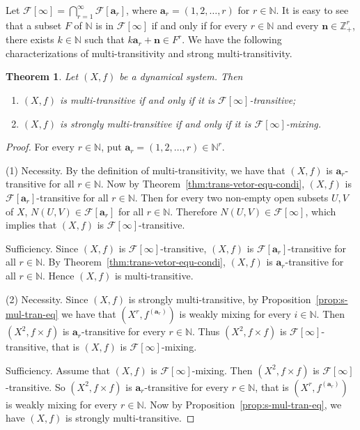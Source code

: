 \documentclass[12pt,a4paper]{amsart}
\newtheorem{thm}{Theorem}[section]
\theoremstyle{definition}
\numberwithin{equation}{section}
\begin{document}
Let $\mathcal{F}[\infty]=\bigcap\limits_{r=1}^\infty \mathcal{F}[\mathbf{a}_r]$,
where $\mathbf{a}_r=(1,2,\dotsc,r)$  for $r\in\mathbb{N}$.
It is easy to see that a subset $F$ of $\mathbb{N}$ is in $\mathcal{F}[\infty]$ if and only if
for every $r\in\mathbb{N}$ and every $\mathbf{n}\in \mathbb{Z}_+^r$, there exists $k\in\mathbb{N}$
such that $k\mathbf{a}_r+\mathbf{n}\in F^r$.
We have the following characterizations of multi-transitivity and strong  multi-transitivity.

\begin{thm}\label{thm:multi-trans-equ-condi-infty}
Let $(X,f)$ be a dynamical system. Then
\begin{enumerate}
  \item $(X,f)$ is multi-transitive if and only if it is $\mathcal{F}[\infty]$-transitive;
  \item $(X,f)$ is strongly multi-transitive if and only if it is $\mathcal{F}[\infty]$-mixing.
\end{enumerate}
\end{thm}

\begin{proof}
For every $r\in\mathbb{N}$, put $\mathbf{a}_r=(1,2,\dotsc,r)\in \mathbb{N}^r$.

(1) Necessity. By the definition of multi-transitivity,
we have that $(X,f)$ is $\mathbf{a}_r$-transitive for all $r\in\mathbb{N}$.
Now by Theorem~\ref{thm:trans-vetor-equ-condi},
$(X,f)$ is $\mathcal{F}[\mathbf{a}_r]$-transitive for all $r\in\mathbb{N}$.
Then for every two non-empty open subsets $U,V$ of $X$,
$N(U,V)\in \mathcal{F}[\mathbf{a}_r]$ for all $r\in\mathbb{N}$.
Therefore $N(U,V)\in \mathcal{F}[\infty]$,
which implies that $(X,f)$ is $\mathcal{F}[\infty]$-transitive.

Sufficiency. Since $(X,f)$ is $\mathcal{F}[\infty]$-transitive,
$(X,f)$ is $\mathcal{F}[\mathbf{a}_r]$-transitive for all $r\in\mathbb{N}$.
By Theorem~\ref{thm:trans-vetor-equ-condi},
$(X,f)$ is $\mathbf{a}_r$-transitive for all $r\in\mathbb{N}$.
Hence $(X,f)$ is multi-transitive.

(2) Necessity. Since $(X,f)$ is strongly multi-transitive,
by Proposition~\ref{prop:s-mul-tran-eq} we have that $(X^r,f^{(\mathbf{a}_r)})$
is weakly mixing for every $i\in\mathbb{N}$.
Then $(X^2,f\times f)$ is $\mathbf{a}_r$-transitive for every $r\in\mathbb{N}$.
Thus $(X^2,f\times f)$ is $\mathcal{F}[\infty]$-transitive,
that is $(X,f)$ is $\mathcal{F}[\infty]$-mixing.

Sufficiency. Assume that $(X,f)$ is $\mathcal{F}[\infty]$-mixing.
Then $(X^2,f\times f)$ is $\mathcal{F}[\infty]$-transitive.
So $(X^2,f\times f)$ is $\mathbf{a}_r$-transitive for every $r\in\mathbb{N}$,
that is $(X^r,f^{(\mathbf{a}_r)})$ is weakly mixing for every $r\in\mathbb{N}$.
Now by Proposition~\ref{prop:s-mul-tran-eq},
we have $(X,f)$ is strongly multi-transitive.
\end{proof}
\end{document}

